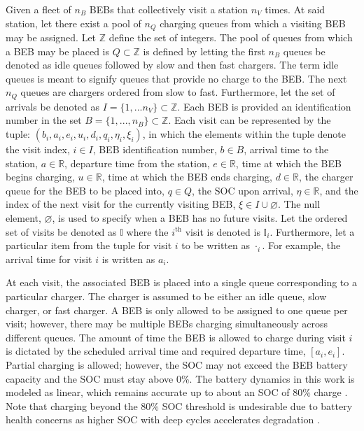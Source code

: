 \documentclass[ee,thesis]{usuthesis}
\newcommand{\visit}{(b_i, a_i, e_i, u_i, d_i, q_i, \eta_i, \xi_i)}
\newcommand{\I}{\mathbb{I}}                 %
\newcommand{\Iset}{I}                       %
\newcommand{\Qset}{Q}                       %
\begin{document}
Given a fleet of \(n_B\) BEBs that collectively visit a station \(n_V\) times. At said station, let there exist a pool of
\(n_Q\) charging queues from which a visiting BEB may be assigned. Let \(\mathbb{Z}\) define the set of integers. The pool of queues
from which a BEB may be placed is \(\Qset \subset \mathbb{Z}\) is defined by letting the first \(n_B\) queues be denoted as idle queues
followed by slow and then fast chargers. The term idle queues is meant to signify queues that provide no charge to the
BEB. The next \(n_Q\) queues are chargers ordered from slow to fast. Furthermore, let the set of arrivals be denoted as
\(\Iset = \{ 1, ... n_V \} \subset \mathbb{Z}\). Each BEB is provided an identification number in the set \(B = \{ 1, ..., n_B \} \subset \mathbb{Z}\).
Each visit can be represented by the tuple: \(\visit\), in which the elements within the tuple denote the visit index, \(i
\in I\), BEB identification number, \(b \in B\), arrival time to the station, \(a \in \mathbb{R}\), departure time from the station, \(e \in
\mathbb{R}\), time at which the BEB begins charging, \(u \in \mathbb{R}\), time at which the BEB ends charging, \(d \in \mathbb{R}\), the charger queue for
the BEB to be placed into, \(q \in Q\), the SOC upon arrival, \(\eta \in \mathbb{R}\), and the index of the next visit for the currently
visiting BEB, \(\xi \in I \cup \varnothing\). The null element, \(\varnothing\), is used to specify when a BEB has no future
visits. Let the ordered set of visits be denoted as \(\I\) where the \(i^{\text{th}}\) visit is denoted is \(\I_i\).
Furthermore, let a particular item from the tuple for visit \(i\) to be written as \(\cdot_i\). For example, the arrival time
for visit \(i\) is written as \(a_i\).

At each visit, the associated BEB is placed into a single queue corresponding to a particular charger. The charger is
assumed to be either an idle queue, slow charger, or fast charger. A BEB is only allowed to be assigned to one queue per
visit; however, there may be multiple BEBs charging simultaneously across different queues. The amount of time the BEB
is allowed to charge during visit \(i\) is dictated by the scheduled arrival time and required departure time, \([a_i,
e_i]\). Partial charging is allowed; however, the SOC may not exceed the BEB battery capacity and the SOC must stay above
0\%. The battery dynamics in this work is modeled as linear, which remains accurate up to about an SOC of 80\% charge
\cite{liu-2020-batter-elect}. Note that charging beyond the 80\% SOC threshold is undesirable due to battery health
concerns as higher SOC with deep cycles accelerates degradation \cite{edge-2021-lithium,millner-2010-model-lithium}.
\end{document}
